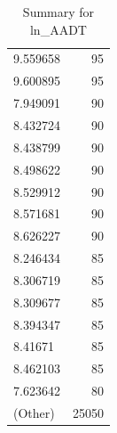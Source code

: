 \begin{table}[ht]
\begin{tabular}{lr}
  9.559658 &  95 \\ 
  9.600895 &  95 \\ 
  7.949091 &  90 \\ 
  8.432724 &  90 \\ 
  8.438799 &  90 \\ 
  8.498622 &  90 \\ 
  8.529912 &  90 \\ 
  8.571681 &  90 \\ 
  8.626227 &  90 \\ 
  8.246434 &  85 \\ 
  8.306719 &  85 \\ 
  8.309677 &  85 \\ 
  8.394347 &  85 \\ 
  8.41671 &  85 \\ 
  8.462103 &  85 \\ 
  7.623642 &  80 \\ 
  (Other) & 25050 \\ 
   \hline
\end{tabular}
\caption{Summary for ln_AADT} 
\label{tab: ln_AADT}
\end{table}
